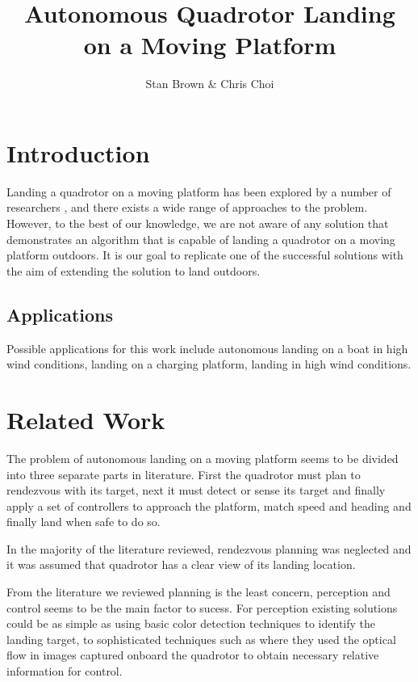 \documentclass{article}
\begin{document}
\title{Autonomous Quadrotor Landing on a Moving Platform}
\author{Stan Brown \& Chris Choi}
\maketitle



\section*{Introduction}
Landing a quadrotor on a moving platform has been explored by a number of researchers \cite{Lee2012, Kim2014, Voos2010, Friis2009, Ling2014, Herisse2012}, and there exists a wide range of approaches to the problem. However, to the best of our knowledge, we are not aware of any solution that demonstrates an algorithm that is capable of landing a quadrotor on a moving platform outdoors. It is our goal to replicate one of the successful solutions with the aim of extending the solution to land outdoors.

\subsection*{Applications}
Possible applications for this work include autonomous landing on a boat in high wind conditions, landing on a charging platform, landing in high wind conditions.


\section*{Related Work} 
The problem of autonomous landing on a moving platform seems to be divided into three separate parts in literature. First the quadrotor must plan to rendezvous with its target, next it must detect or sense its target and finally apply a set of controllers to approach the platform, match speed and heading and finally land when safe to do so. 

In the majority of the literature reviewed, rendezvous planning was neglected and it was assumed that quadrotor has a clear view of its landing location.

From the literature we reviewed planning is the least concern, perception and control seems to be the main factor to sucess. For perception existing solutions could be as simple as using basic color detection techniques to identify the landing target\cite{Kim2014}, to sophisticated techniques such as \cite{Herisse2012} where they used the optical flow in images captured onboard the quadrotor to obtain necessary relative information for control.
\end{document}
